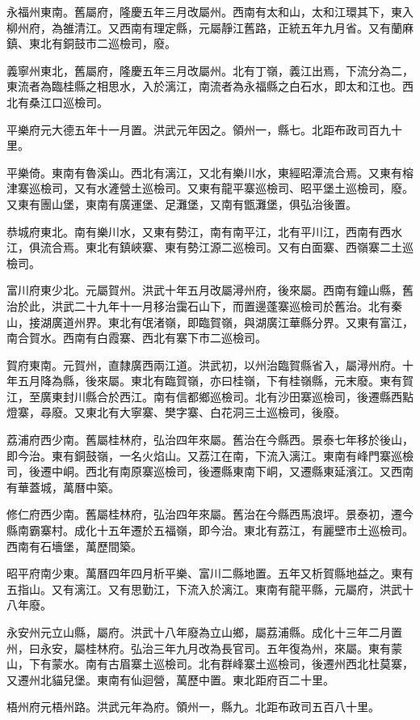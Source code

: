 永福州東南。舊屬府，隆慶五年三月改屬州。西南有太和山，太和江環其下，東入柳州府，為雒清江。又西南有理定縣，元屬靜江舊路，正統五年九月省。又有蘭麻鎮、東北有銅鼓市二巡檢司，廢。

義寧州東北，舊屬府，隆慶五年三月改屬州。北有丁嶺，義江出焉，下流分為二，東流者為臨桂縣之相思水，入於漓江，南流者為永福縣之白石水，即太和江也。西北有桑江口巡檢司。

平樂府元大德五年十一月置。洪武元年因之。領州一，縣七。北距布政司百九十里。

平樂倚。東南有魯溪山。西北有漓江，又北有樂川水，東經昭潭流合焉。又東有榕津寨巡檢司，又有水滻營土巡檢司。又東有龍平寨巡檢司、昭平堡土巡檢司，廢。又東有團山堡，東南有廣運堡、足灘堡，又南有甑灘堡，俱弘治後置。

恭城府東北。南有樂川水，又東有勢江，南有南平江，北有平川江，西南有西水江，俱流合焉。東北有鎮峽寨、東有勢江源二巡檢司。又有白面寨、西嶺寨二土巡檢司。

富川府東少北。元屬賀州。洪武十年五月改屬潯州府，後來屬。西南有鐘山縣，舊治於此，洪武二十九年十一月移治靄石山下，而置邊蓬寨巡檢司於舊治。北有秦山，接湖廣道州界。東北有氓渚嶺，即臨賀嶺，與湖廣江華縣分界。又東有富江，南合賀水。西南有白霞寨、西北有寨下市二巡檢司。

賀府東南。元賀州，直隸廣西兩江道。洪武初，以州治臨賀縣省入，屬潯州府。十年五月降為縣，後來屬。東北有臨賀嶺，亦曰桂嶺，下有桂嶺縣，元末廢。東有賀江，至廣東封川縣合於西江。南有信都鄉巡檢司。北有沙田寨巡檢司，後遷縣西點燈寨，尋廢。又東北有大寧寨、樊字寨、白花洞三土巡檢司，後廢。

荔浦府西少南。舊屬桂林府，弘治四年來屬。舊治在今縣西。景泰七年移於後山，即今治。東有銅鼓嶺，一名火焰山。又荔江在南，下流入漓江。東南有峰門寨巡檢司，後遷中峒。西北有南原寨巡檢司，後遷縣東南下峒，又遷縣東延濱江。又西南有華蓋城，萬曆中築。

修仁府西少南。舊屬桂林府，弘治四年來屬。舊治在今縣西馬浪坪。景泰初，遷今縣南霸寨村。成化十五年遷於五福嶺，即今治。東北有荔江，有麗壁市土巡檢司。西南有石墻堡，萬歷間築。

昭平府南少東。萬曆四年四月析平樂、富川二縣地置。五年又析賀縣地益之。東有五指山。又有漓江。又有思勤江，下流入於漓江。東南有龍平縣，元屬府，洪武十八年廢。

永安州元立山縣，屬府。洪武十八年廢為立山鄉，屬荔浦縣。成化十三年二月置州，曰永安，屬桂林府。弘治三年九月改為長官司。五年復為州，來屬。東有蒙山，下有蒙水。南有古眉寨土巡檢司。北有群峰寨土巡檢司，後遷州西北杜莫寨，又遷州北貓兒堡。東南有仙迴營，萬歷中置。東北距府百二十里。

梧州府元梧州路。洪武元年為府。領州一，縣九。北距布政司五百八十里。

